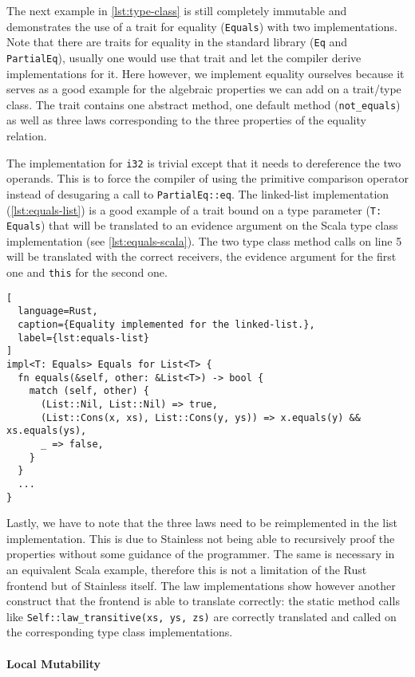 The next example in \autoref{lst:type-class} is still completely immutable and
demonstrates the use of a trait for equality (\lstinline!Equals!) with two
implementations. Note that there are traits for equality in the standard library
(\lstinline!Eq! and \lstinline!PartialEq!), usually one would use that trait and
let the compiler derive implementations for it. Here however, we implement
equality ourselves because it serves as a good example for the algebraic
properties we can add on a trait/type class. The trait contains one abstract
method, one default method (\lstinline!not_equals!) as well as three laws
corresponding to the three properties of the equality relation.

The implementation for \lstinline!i32! is trivial except that it needs to
dereference the two operands. This is to force the compiler of using the
primitive comparison operator instead of desugaring a call to
\lstinline!PartialEq::eq!. The linked-list implementation
(\autoref{lst:equals-list}) is a good example of a trait bound on a type
parameter (\lstinline!T: Equals!) that will be translated to an evidence
argument on the Scala type class implementation (see
\autoref{lst:equals-scala}). The two type class method calls on line 5 will be
translated with the correct receivers, the evidence argument for the first one
and \lstinline!this! for the second one.

\begin{lstlisting}[
  language=Rust,
  caption={Equality implemented for the linked-list.},
  label={lst:equals-list}
]
impl<T: Equals> Equals for List<T> {
  fn equals(&self, other: &List<T>) -> bool {
    match (self, other) {
      (List::Nil, List::Nil) => true,
      (List::Cons(x, xs), List::Cons(y, ys)) => x.equals(y) && xs.equals(ys),
      _ => false,
    }
  }
  ...
}
\end{lstlisting}

Lastly, we have to note that the three laws need to be reimplemented in the list
implementation. This is due to Stainless not being able to recursively proof the
properties without some guidance of the programmer. The same is necessary in an
equivalent Scala example, therefore this is not a limitation of the Rust
frontend but of Stainless itself. The law implementations show however another
construct that the frontend is able to translate correctly: the static method
calls like \lstinline!Self::law_transitive(xs, ys, zs)! are correctly translated
and called on the corresponding type class implementations.

\paragraph{Local Mutability}


